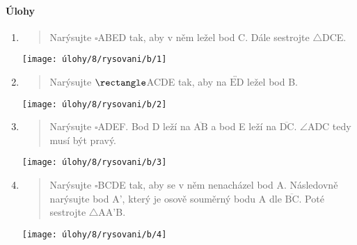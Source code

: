 \paragraph{Úlohy}
\begin{enumerate}
    \item
    \begin{minipage}[t]{\linewidth}
        \begin{quote}
            Narýsujte $\square$ABED tak, aby v něm ležel bod C. Dále sestrojte $\triangle$DCE\@.
        \end{quote}
        \centering
        \texttt{[image: úlohy/8/rysovani/b/1]}

    \end{minipage}

    \item
    \begin{minipage}[t]{\linewidth}
        \begin{quote}
            Narýsujte $\rectangle$ACDE tak, aby na $\overleftrightarrow{\text{ED}}$ ležel bod B\@.
        \end{quote}
        \centering
        \texttt{[image: úlohy/8/rysovani/b/2]}

    \end{minipage}

    \item
    \begin{minipage}[t]{\linewidth}
        \begin{quote}
            Narýsujte $\square$ADEF. Bod D leží na $\overline{\text{AB}}$ a bod E leží na $\overline{\text{DC}}$. $\angle$ADC tedy musí být pravý.
        \end{quote}
        \centering
        \texttt{[image: úlohy/8/rysovani/b/3]}

    \end{minipage}

    \item
    \begin{minipage}[t]{\linewidth}
        \begin{quote}
            Narýsujte $\square$BCDE tak, aby se v něm nenacházel bod A. Následovně narýsujte bod A', který je osově souměrný bodu A dle $\overline{\text{BC}}$.
            Poté sestrojte $\triangle$AA'B.
        \end{quote}
        \centering
        \texttt{[image: úlohy/8/rysovani/b/4]}

    \end{minipage}


\end{enumerate}
